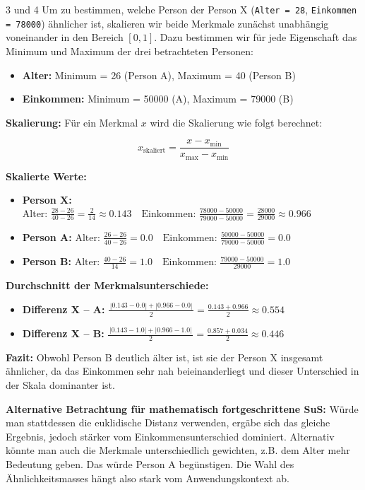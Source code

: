 \begin{aufgabe}{3 und 4}
Um zu bestimmen, welche Person der Person X (\texttt{Alter = 28}, \texttt{Einkommen = 78000}) ähnlicher ist, skalieren wir beide Merkmale zunächst unabhängig voneinander in den Bereich $[0,1]$. Dazu bestimmen wir für jede Eigenschaft das Minimum und Maximum der drei betrachteten Personen:

\begin{itemize}
\item \textbf{Alter:} Minimum = 26 (Person A), Maximum = 40 (Person B)
\item \textbf{Einkommen:} Minimum = 50000 (A), Maximum = 79000 (B)
\end{itemize}

\textbf{Skalierung:}
Für ein Merkmal $x$ wird die Skalierung wie folgt berechnet:

$$
x_{\text{skaliert}} = \frac{x - x_{\min}}{x_{\max} - x_{\min}}
$$

\textbf{Skalierte Werte:}

\begin{itemize}
\item \textbf{Person X:}
$     \text{Alter: } \frac{28 - 26}{40 - 26} = \frac{2}{14} \approx 0.143 \quad\text{Einkommen: } \frac{78000 - 50000}{79000 - 50000} = \frac{28000}{29000} \approx 0.966
    $
\item \textbf{Person A:}
$     \text{Alter: } \frac{26 - 26}{40 - 26} = 0.0 \quad\text{Einkommen: } \frac{50000 - 50000}{79000 - 50000} = 0.0
    $
\item \textbf{Person B:}
$     \text{Alter: } \frac{40 - 26}{14} = 1.0 \quad\text{Einkommen: } \frac{79000 - 50000}{29000} = 1.0
    $
\end{itemize}

\textbf{Durchschnitt der Merkmalsunterschiede:}

\begin{itemize}
\item \textbf{Differenz X – A:}
$     \frac{\,|0.143 - 0.0| + |0.966 - 0.0|\,}{2} = \frac{0.143 + 0.966}{2} \approx 0.554
    $
\item \textbf{Differenz X – B:}
$     \frac{\,|0.143 - 1.0| + |0.966 - 1.0|\,}{2} = \frac{0.857 + 0.034}{2} \approx 0.446
    $
\end{itemize}

\textbf{Fazit:} Obwohl Person B deutlich älter ist, ist sie der Person X insgesamt ähnlicher, da das Einkommen sehr nah beieinanderliegt und dieser Unterschied in der Skala dominanter ist.

\vspace{1em}

\textbf{Alternative Betrachtung für mathematisch fortgeschrittene SuS:} Würde man stattdessen die euklidische Distanz verwenden, ergäbe sich das gleiche Ergebnis, jedoch stärker vom Einkommensunterschied dominiert. Alternativ könnte man auch die Merkmale unterschiedlich gewichten, z.B. dem Alter mehr Bedeutung geben. Das würde Person A begünstigen. Die Wahl des Ähnlichkeitsmasses hängt also stark vom Anwendungskontext ab.

\end{aufgabe}


